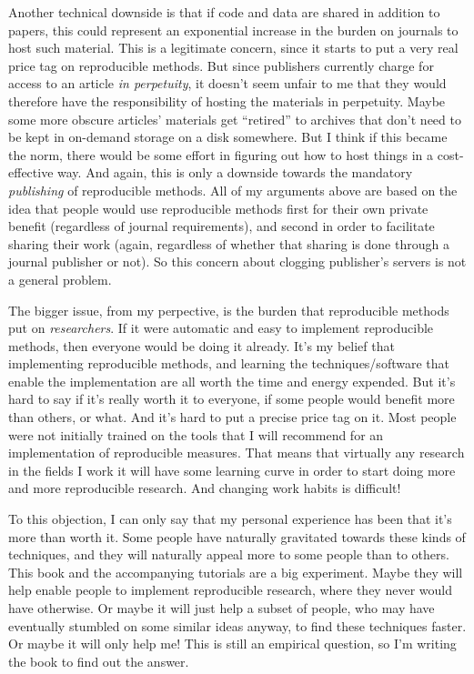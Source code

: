 \documentclass{book}
\begin{document}
Another technical downside is that if code and data are shared in addition to papers, this could represent an exponential increase in the burden on journals to host such material. This is a legitimate concern, since it starts to put a very real price tag on reproducible methods.  But since publishers currently charge for access to an article \emph{in perpetuity}, it doesn't seem unfair to me that they would therefore have the responsibility of hosting the materials in perpetuity.  Maybe some more obscure articles' materials get ``retired'' to archives that don't need to be kept in on-demand storage on a disk somewhere.  But I think if this became the norm, there would be some effort in figuring out how to host things in a cost-effective way.  And again, this is only a downside towards the mandatory \emph{publishing} of reproducible methods.  All of my arguments above are based on the idea that people would use reproducible methods first for their own private benefit (regardless of journal requirements), and second in order to facilitate sharing their work (again, regardless of whether that sharing is done through a journal publisher or not). So this concern about clogging publisher's servers is not a general problem.

The bigger issue, from my perpective, is the burden that reproducible methods put on \emph{researchers}. If it were automatic and easy to implement reproducible methods, then everyone would be doing it already. It's my belief that implementing reproducible methods, and learning the techniques/software that enable the implementation are all worth the time and energy expended. But it's hard to say if it's really worth it to everyone, if some people would benefit more than others, or what.  And it's hard to put a precise price tag on it.  Most people were not initially trained on the tools that I will recommend for an implementation of reproducible measures. That means that virtually any research in the fields I work it will have some learning curve in order to start doing more and more reproducible research. And changing work habits is difficult!

To this objection, I can only say that my personal experience has been that it's more than worth it. Some people have naturally gravitated towards these kinds of techniques, and they will naturally appeal more to some people than to others. This book and the accompanying tutorials are a big experiment. Maybe they will help enable people to implement reproducible research, where they never would have otherwise. Or maybe it will just help a subset of people, who may have eventually stumbled on some similar ideas anyway, to find these techniques faster. Or maybe it will only help me!  This is still an empirical question, so I'm writing the book to find out the answer.
\end{document}

